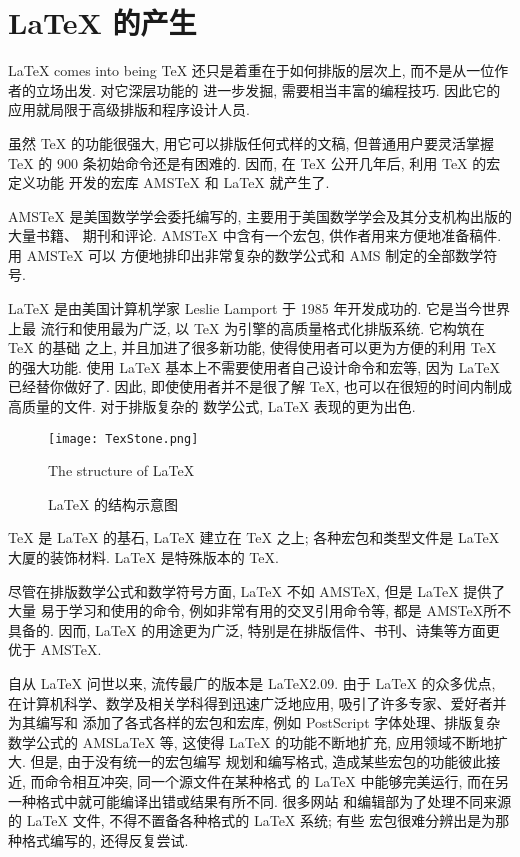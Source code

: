 \chapter{\LaTeX{} \index{\LaTeX} 的产生}{\LaTeX{} comes into being}
\TeX{} \index{\TeX} 还只是着重在于如何排版的层次上, 而不是从一位作者的立场出发. 对它深层功能的
进一步发掘, 需要相当丰富的编程技巧. 因此它的应用就局限于高级排版和程序设计人员.

虽然 \TeX{} \index{\TeX} 的功能很强大, 用它可以排版任何式样的文稿, 但普通用户要灵活掌握 \TeX{} \index{\TeX}
的 900 条初始命令还是有困难的. 因而, 在 \TeX{} \index{\TeX} 公开几年后, 利用 \TeX{} \index{\TeX} 的宏定义功能
开发的宏库 AMS\TeX{} 和 \LaTeX{} \index{\LaTeX} 就产生了.

AMS\TeX{} 是美国数学学会委托编写的, 主要用于美国数学学会及其分支机构出版的大量书籍、
期刊和评论. AMS\TeX{} 中含有一个宏包, 供作者用来方便地准备稿件. 用 AMS\TeX{} 可以
方便地排印出非常复杂的数学公式和 AMS 制定的全部数学符号.

\LaTeX{} \index{\LaTeX} 是由美国计算机学家 Leslie Lamport 于 1985 年开发成功的. 它是当今世界上最
流行和使用最为广泛, 以 \TeX{}\index{\TeX} 为引擎的高质量格式化排版系统. 它构筑在 \TeX{} 的基础
之上, 并且加进了很多新功能, 使得使用者可以更为方便的利用 \TeX{}\index{\TeX} 的强大功能. 使用
\LaTeX{}\index{\LaTeX} 基本上不需要使用者自己设计命令和宏等, 因为 \LaTeX{}\index{\LaTeX} 已经替你做好了. 因此,
即使使用者并不是很了解 \TeX\index{\TeX}, 也可以在很短的时间内制成高质量的文件. 对于排版复杂的
数学公式, \LaTeX{}\index{\LaTeX} 表现的更为出色.

\begin{figure}
  \centering
  \texttt{[image: TexStone.png]}\\
  \caption{\LaTeX{}\index{\LaTeX} 的结构示意图}{The structure of \LaTeX}
  \label{fig:TheStructureOfLaTeX}
\end{figure}


\TeX{}\index{\TeX} 是 \LaTeX{}\index{\LaTeX} 的基石, \LaTeX{}\index{\LaTeX} 建立在 \TeX{}\index{\TeX} 之上; 各种宏包和类型文件是 \LaTeX{}\index{\LaTeX}
大厦的装饰材料. \LaTeX{}\index{\LaTeX} 是特殊版本的 \TeX\index{\TeX}.

尽管在排版数学公式和数学符号方面, \LaTeX{}\index{\LaTeX} 不如 AMS\TeX, 但是 \LaTeX{}\index{\LaTeX} 提供了大量
易于学习和使用的命令, 例如非常有用的交叉引用命令等, 都是 AMS\TeX 所不具备的. 因而,
\LaTeX{}\index{\LaTeX} 的用途更为广泛, 特别是在排版信件、书刊、诗集等方面更优于 AMS\TeX.

自从 \LaTeX{}\index{\LaTeX} 问世以来, 流传最广的版本是 \LaTeX{}2.09\index{\LaTeX}. 由于 \LaTeX{}\index{\LaTeX} 的众多优点,
在计算机科学、数学及相关学科得到迅速广泛地应用, 吸引了许多专家、爱好者并为其编写和
添加了各式各样的宏包和宏库, 例如 PostScript 字体处理、排版复杂数学公式的 AMS\LaTeX{} 等,
这使得 \LaTeX{}\index{\LaTeX} 的功能不断地扩充, 应用领域不断地扩大. 但是, 由于没有统一的宏包编写
规划和编写格式, 造成某些宏包的功能彼此接近, 而命令相互冲突, 同一个源文件在某种格式
的 \LaTeX{}\index{\LaTeX} 中能够完美运行, 而在另一种格式中就可能编译出错或结果有所不同. 很多网站
和编辑部为了处理不同来源的 \LaTeX{}\index{\LaTeX} 文件, 不得不置备各种格式的 \LaTeX{}\index{\LaTeX} 系统; 有些
宏包很难分辨出是为那种格式编写的, 还得反复尝试.

